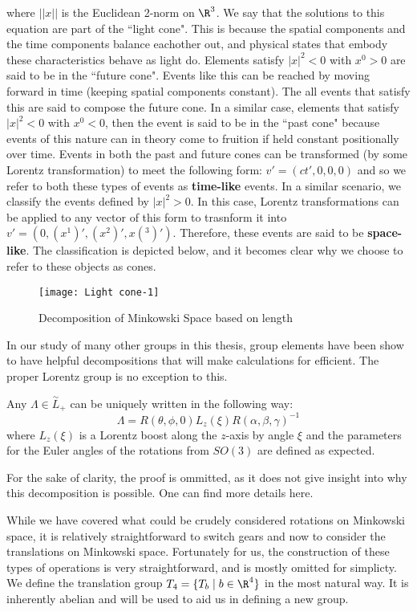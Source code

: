 \noindent where $||x||$ is the Euclidean 2-norm on $\R^3$. We say that the solutions to this equation are part of the ``light cone". This is because the spatial components and the time components balance eachother out, and physical states that embody these characteristics behave as light do. Elements satisfy $|x|^2 < 0$ with $x^0>0$ are said to be  in the ``future cone". Events like this can be reached by moving forward in time (keeping spatial components constant). The all events that satisfy this are said to compose the future cone. In a similar case, elements that satisfy $|x|^2 < 0$ with $x^0<0$, then the event is said to be in the ``past cone" because events of this nature can in theory come to fruition if held constant positionally over time. Events in both the past and future cones can be transformed (by some Lorentz transformation) to meet the following form: $v' = (ct',0,0,0)$ and so we refer to both these types of events as \textbf{time-like} events. In a similar scenario, we classify the events defined by $|x|^2 >0$. In this case, Lorentz transformations can be applied to any vector of this form to trasnform it into $v' = (0,(x^1)',(x^2)',x(^3)')$. Therefore, these events are said to be \textbf{space-like}. The classification is depicted below, and it becomes clear why we choose to refer to these objects as cones.

\begin{figure}[H]
	\centering
	\texttt{[image: Light cone-1]}
	\caption{Decomposition of Minkowski Space based on length}
\end{figure}

In our study of many other groups in this thesis, group elements have been show to have helpful decompositions that will make calculations for efficient. The proper Lorentz group is no exception to this.

\begin{theorem}
	Any $\Lambda \in \overset{\sim}{L}_+$ can be uniquely written in the following way:
$$\Lambda = R(\theta,\phi,0)L_z(\xi)R(\alpha,\beta,\gamma)^{-1}$$
where $L_z(\xi)$ is a Lorentz boost along the $z$-axis by angle $\xi$ and the parameters for the Euler angles of the rotations from $SO(3)$ are defined as expected.
\end{theorem}

For the sake of clarity, the proof is ommitted, as it does not give insight into why this decomposition is possible. One can find more details here.\cite{Tung}

While we have covered what could be crudely considered rotations on Minkowski space, it is relatively straightforward to switch gears and now to consider the translations on Minkowski space. Fortunately for us, the construction of these types of operations is very straightforward, and is mostly omitted for simplicty. We define the translation group $T_4 = \{T_b \mid b\in\R^4\}$ in the most natural way. It is inherently abelian and will be used to aid us in defining a new group.

